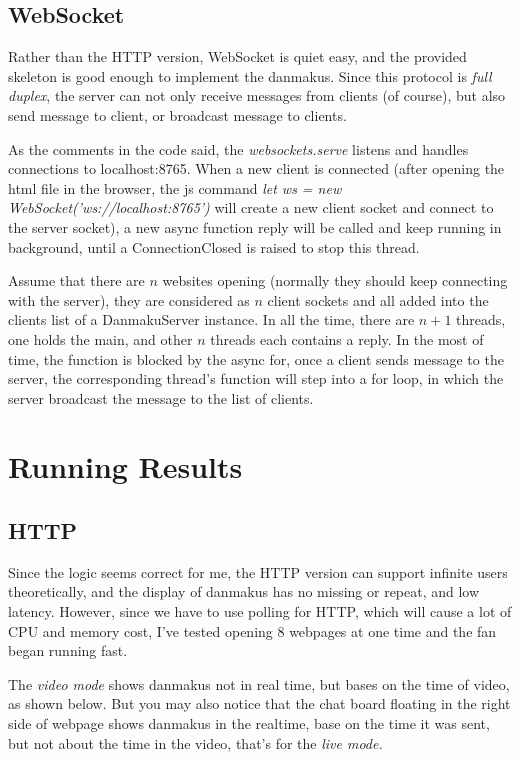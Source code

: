 \documentclass[onecolumn, oneside, ctexart]{SUSTechHomework}
\begin{document}
\subsection{WebSocket}
Rather than the HTTP version, WebSocket is quiet easy, and the provided skeleton is good enough to implement the danmakus. Since this protocol is \emph{full duplex}, the server can not only receive messages from clients (of course), but also send message to client, or broadcast message to clients.
\par As the comments in the code said, the \emph{websockets.serve} listens and handles connections to localhost:8765. When a new client is connected (after opening the html file in the browser, the js command \textit{let ws = new WebSocket('ws://localhost:8765')} will create a new client socket and connect to the server socket), a new async function reply will be called and keep running in background, until a ConnectionClosed is raised to stop this thread.
\par Assume that there are $n$ websites opening (normally they should keep connecting with the server), they are considered as $n$ client sockets and all added into the clients list of a DanmakuServer instance. In all the time, there are $n+1$ threads, one holds the main, and other $n$ threads each contains a reply. In the most of time, the function is blocked by the async for, once a client sends message to the server, the corresponding thread's function will step into a for loop, in which the server broadcast the message to the list of clients.


\section{Running Results}

\subsection{HTTP}
Since the logic seems correct for me, the HTTP version can support infinite users theoretically, and the display of danmakus has no missing or repeat, and low latency. However, since we have to use polling for HTTP, which will cause a lot of CPU and memory cost, I've tested opening 8 webpages at one time and the fan began running fast.

\par The \emph{video mode} shows danmakus not in real time, but bases on the time of video, as shown below. But you may also notice that the chat board floating in the right side of webpage shows danmakus in the realtime, base on the time it was sent, but not about the time in the video, that's for the \emph{live mode.}\\
\end{document}
